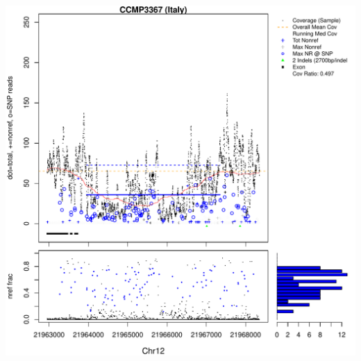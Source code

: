\documentclass{article}\usepackage[]{graphicx}\usepackage[]{color}
\makeatletter
\def\maxwidth{ %
  \ifdim\Gin@nat@width>\linewidth
    \linewidth
  \else
    \Gin@nat@width
  \fi
}
\newenvironment{knitrout}{}{} %
\makeatother
\begin{document}
\begin{knitrout}
{\includegraphics[width=\maxwidth]{figs-knitr/unnamed-chunk-54-7} 

}



\end{knitrout}
\end{document}
